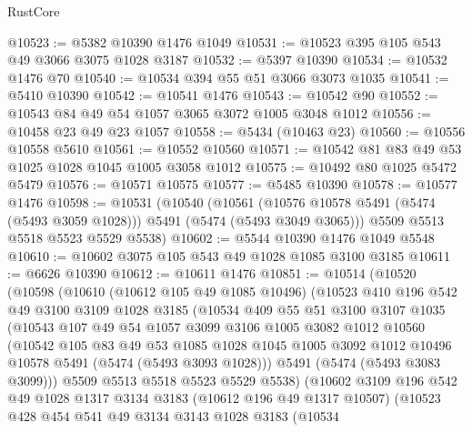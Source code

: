 \begin{lexlean}{RustCore}
\begin{coremodule}
@10523 := @5382 @10390 @1476 @1049
@10531 := @10523 @395 @105 @543 @49 @3066 @3075 @1028 @3187
@10532 := @5397 @10390
@10534 := @10532 @1476 @70
@10540 := @10534 @394 @55 @51 @3066 @3073 @1035
@10541 := @5410 @10390
@10542 := @10541 @1476
@10543 := @10542 @90
@10552 := @10543 @84 @49 @54 @1057 @3065 @3072 @1005 @3048 @1012
@10556 := @10458 @23 @49 @23 @1057
@10558 := @5434 (@10463 @23)
@10560 := @10556 @10558 @5610
@10561 := @10552 @10560
@10571 := @10542 @81 @83 @49 @53 @1025 @1028 @1045 @1005 @3058 @1012
@10575 := @10492 @80 @1025 @5472 @5479
@10576 := @10571 @10575
@10577 := @5485 @10390
@10578 := @10577 @1476
@10598 := @10531
    (@10540
      (@10561 (@10576 @10578 @5491 (@5474 (@5493 @3059 @1028))) @5491 (@5474 (@5493 @3049 @3065)))
      @5509
      @5513
      @5518
      @5523
      @5529
      @5538)
@10602 := @5544 @10390 @1476 @1049 @5548
@10610 := @10602 @3075 @105 @543 @49 @1028 @1085 @3100 @3185
@10611 := @6626 @10390
@10612 := @10611 @1476
@10851 := @10514
    (@10520
      (@10598
        (@10610
          (@10612 @105 @49 @1085 @10496)
          (@10523
            @410
            @196
            @542
            @49
            @3100
            @3109
            @1028
            @3185
            (@10534
              @409
              @55
              @51
              @3100
              @3107
              @1035
              (@10543
                @107
                @49
                @54
                @1057
                @3099
                @3106
                @1005
                @3082
                @1012
                @10560
                (@10542
                  @105
                  @83
                  @49
                  @53
                  @1085
                  @1028
                  @1045
                  @1005
                  @3092
                  @1012
                  @10496
                  @10578
                  @5491
                  (@5474 (@5493 @3093 @1028)))
                @5491
                (@5474 (@5493 @3083 @3099)))
              @5509
              @5513
              @5518
              @5523
              @5529
              @5538)
            (@10602
              @3109
              @196
              @542
              @49
              @1028
              @1317
              @3134
              @3183
              (@10612 @196 @49 @1317 @10507)
              (@10523
                @428
                @454
                @541
                @49
                @3134
                @3143
                @1028
                @3183
                (@10534

\end{coremodule}
\end{lexlean}
